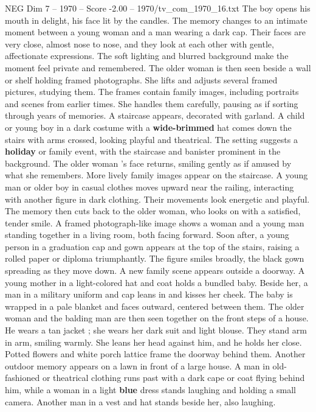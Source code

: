 \begin{textsample}{NEG Dim 7 – 1970 – Score -2.00 – 1970/tv\_com\_1970\_16.txt}
The boy opens his mouth in delight, his face lit by the candles.
The memory changes to an intimate moment between a young woman and a man wearing a dark cap.
Their faces are very close, almost nose to nose, and they look at each other with gentle, affectionate expressions.
The soft lighting and blurred background make the moment feel private and remembered.
The older woman is then seen beside a wall or shelf holding framed photographs.
She lifts and adjusts several framed pictures, studying them.
The frames contain family images, including portraits and scenes from earlier times.
She handles them carefully, pausing as if sorting through years of memories.
A staircase appears, decorated with garland.
A child or young boy in a dark costume with a \textbf{wide-brimmed} hat comes down the stairs with arms crossed, looking playful and theatrical.
The setting suggests a \textbf{holiday} or family event, with the staircase and banister prominent in the background.
The older woman ’s face returns, smiling gently as if amused by what she remembers.
More lively family images appear on the staircase.
A young man or older boy in casual clothes moves upward near the railing, interacting with another figure in dark clothing.
Their movements look energetic and playful.
The memory then cuts back to the older woman, who looks on with a satisfied, tender smile.
A framed photograph-like image shows a woman and a young man standing together in a living room, both facing forward.
Soon after, a young person in a graduation cap and gown appears at the top of the stairs, raising a rolled paper or diploma triumphantly.
The figure smiles broadly, the black gown spreading as they move down.
A new family scene appears outside a doorway.
A young mother in a light-colored hat and coat holds a bundled baby.
Beside her, a man in a military uniform and cap leans in and kisses her cheek.
The baby is wrapped in a pale blanket and faces outward, centered between them.
The older woman and the balding man are then seen together on the front steps of a house.
He wears a tan jacket ; she wears her dark suit and light blouse.
They stand arm in arm, smiling warmly.
She leans her head against him, and he holds her close.
Potted flowers and white porch lattice frame the doorway behind them.
Another outdoor memory appears on a lawn in front of a large house.
A man in old-fashioned or theatrical clothing runs past with a dark cape or coat flying behind him, while a woman in a light \textbf{blue} dress stands laughing and holding a small camera.
Another man in a vest and hat stands beside her, also laughing.

\end{textsample}
